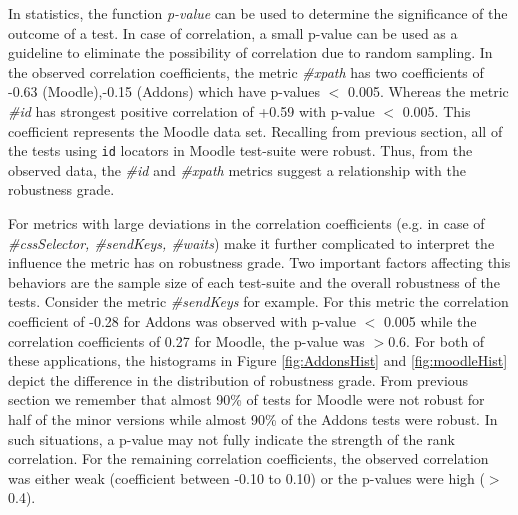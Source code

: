 
In statistics, the function \textit{p-value} can be used to determine the significance of the outcome of a test. In case of correlation, a small p-value can be used as a guideline to eliminate the possibility of correlation due to random sampling. 
In the observed correlation coefficients, the metric \textit{\#xpath} has two coefficients of -0.63 (Moodle),-0.15 (Addons) which have p-values $<$ 0.005. Whereas the metric \textit{\#id} has strongest positive correlation of +0.59 with p-value $<$ 0.005. This coefficient represents the Moodle data set. Recalling from previous section, all of the tests using \texttt{id} locators in Moodle test-suite were robust. Thus, from the observed data, the \textit{\#id} and \textit{\#xpath} metrics suggest a relationship with the robustness grade.  




For metrics with large deviations in the correlation coefficients (e.g. in case of \textit{\#cssSelector, \#sendKeys, \#waits}) make it further complicated to interpret the influence the metric has on robustness grade. Two important factors affecting this behaviors are the sample size of each test-suite and the overall robustness of the tests. Consider the metric \textit{\#sendKeys} for example. For this metric the correlation coefficient of -0.28 for Addons was observed with p-value $<$ 0.005 while the correlation coefficients of 0.27 for Moodle, the p-value was $>$0.6. For both of these applications, the histograms in Figure \ref{fig:AddonsHist} and \ref{fig:moodleHist} depict the difference in the distribution of robustness grade. From previous section we remember that almost 90\% of tests for Moodle were not robust for half of the minor versions while almost 90\% of the Addons tests were robust. In such situations, a p-value may not fully indicate the strength of the rank correlation. For the remaining correlation coefficients, the observed correlation was either weak (coefficient between -0.10 to 0.10) or the p-values were high ($>$ 0.4). 

